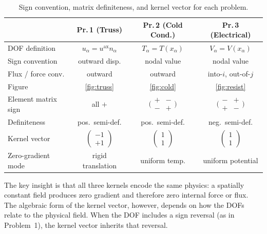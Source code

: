 \documentclass[11pt, a4paper]{article}
\begin{document}
\begin{table}[H]
    \centering
    \renewcommand{\arraystretch}{1.6}
    \begin{tabular}{|l|c|c|c|}
        \hline
        & \textbf{Pr.\,1 (Truss)} & \textbf{Pr.\,2 (Cold Cond.)} & \textbf{Pr.\,3 (Electrical)} \\
        \hline
        DOF definition & $u_\alpha = u^{\mathrm{ax}} n_\alpha$ & $T_\alpha = T(x_\alpha)$ & $V_\alpha = V(x_\alpha)$ \\
        \hline
        Sign convention & outward disp. & nodal value & nodal value \\
        \hline
        Flux / force conv. & outward & outward & into-$i$, out-of-$j$ \\
        \hline
        Figure & \cref{fig:truss} & \cref{fig:cold} & \cref{fig:resist} \\
        \hline
        Element matrix sign & all $+$ & $\bigl(\begin{smallmatrix}+&-\\-&+\end{smallmatrix}\bigr)$ & $\bigl(\begin{smallmatrix}-&+\\+&-\end{smallmatrix}\bigr)$ \\
        \hline
        Definiteness & pos.\ semi-def. & pos.\ semi-def. & neg.\ semi-def. \\
        \hline
        Kernel vector & $\begin{pmatrix}-1\\+1\end{pmatrix}$ & $\begin{pmatrix}1\\1\end{pmatrix}$ & $\begin{pmatrix}1\\1\end{pmatrix}$ \\
        \hline
        Zero-gradient mode & rigid translation & uniform temp. & uniform potential \\
        \hline
    \end{tabular}
    \caption{Sign convention, matrix definiteness, and kernel vector for each problem.}
    \label{tab:convention}
\end{table}

The key insight is that all three kernels encode the same physics: a spatially constant field produces zero gradient and therefore zero internal force or flux.  The algebraic form of the kernel vector, however, depends on how the DOFs relate to the physical field.  When the DOF includes a sign reversal (as in Problem~1), the kernel vector inherits that reversal.
\end{document}
